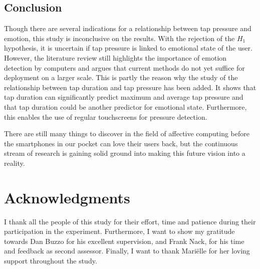 \documentclass{sigchi}
\begin{document}
\subsection{Conclusion} %
\label{sub:conclusion}
Though there are several indications for a relationship between tap pressure and emotion, this study is inconclusive on the results. With the rejection of the $H_1$ hypothesis, it is uncertain if tap pressure is linked to emotional state of the user. However, the literature review still highlights the importance of emotion detection by computers and argues that current methods do not yet suffice for deployment on a larger scale. This is partly the reason why the study of the relationship between tap duration and tap pressure has been added. It shows that tap duration can significantly predict maximum and average tap pressure and that tap duration could be another predictor for emotional state. Furthermore, this enables the use of regular touchscreens for pressure detection.

There are still many things to discover in the field of affective computing before the smartphones in our pocket can love their users back, but the continuous stream of research is gaining solid ground into making this future vision into a reality.

\section{Acknowledgments} %
\label{sec:acknowledgments}
I thank all the people of this study for their effort, time and patience during their participation in the experiment. Furthermore, I want to show my gratitude towards Dan Buzzo for his excellent supervision, and Frank Nack, for his time and feedback as second assessor. Finally, I want to thank Mari\"{e}lle for her loving support throughout the study.



\end{document}
